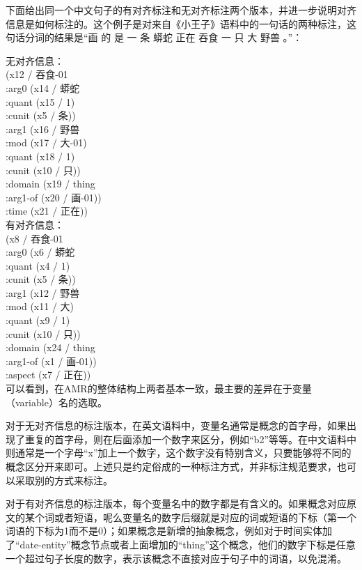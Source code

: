 \documentclass[master, winfont]{njuthesis}
\begin{document}
下面给出同一个中文句子的有对齐标注和无对齐标注两个版本，并进一步说明对齐信息是如何标注的。这个例子是对来自《小王子》语料中的一句话的两种标注，这句话分词的结果是“画 的 是 一 条 蟒蛇 正在 吞食 一 只 大 野兽 。”：

无对齐信息：\\
(x12 / 吞食-01 \\
      :arg0  (x14 / 蟒蛇\\
            :quant  (x15 / 1)\\
            :cunit  (x5 / 条))\\
      :arg1  (x16 / 野兽\\
            :mod  (x17 / 大-01)\\
            :quant  (x18 / 1)\\
            :cunit  (x10 / 只))\\
      :domain  (x19 / thing\\
            :arg1-of  (x20 / 画-01))\\
      :time  (x21 / 正在))\\

有对齐信息：\\
(x8 / 吞食-01\\
      :arg0  (x6 / 蟒蛇\\
            :quant  (x4 / 1)\\
            :cunit  (x5 / 条))\\
      :arg1  (x12 / 野兽\\
            :mod  (x11 / 大)\\
            :quant  (x9 / 1)\\
            :cunit  (x10 / 只))\\
      :domain  (x24 / thing\\
            :arg1-of  (x1 / 画-01))\\
      :aspect  (x7 / 正在))\\

可以看到，在AMR的整体结构上两者基本一致，最主要的差异在于变量（variable）名的选取。

对于无对齐信息的标注版本，在英文语料中，变量名通常是概念的首字母，如果出现了重复的首字母，则在后面添加一个数字来区分，例如“b2”等等。在中文语料中则通常是一个字母“x”加上一个数字，这个数字没有特别含义，只要能够将不同的概念区分开来即可。上述只是约定俗成的一种标注方式，并非标注规范要求，也可以采取别的方式来标注。

对于有对齐信息的标注版本，每个变量名中的数字都是有含义的。如果概念对应原文的某个词或者短语，呢么变量名的数字后缀就是对应的词或短语的下标（第一个词语的下标为1而不是0）；如果概念是新增的抽象概念，例如对于时间实体加了“date-entity”概念节点或者上面增加的“thing”这个概念，他们的数字下标是任意一个超过句子长度的数字，表示该概念不直接对应于句子中的词语，以免混淆。
\end{document}
